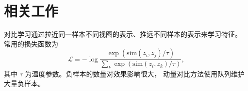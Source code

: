 \chapter{相关工作}
\label{ch:background}

对比学习通过拉近同一样本不同视图的表示、推远不同样本的表示来学习特征。
常用的损失函数为
\begin{equation}
  \mathcal{L} = -\log \frac{\exp(\mathrm{sim}(z_i, z_j)/\tau)}
  {\sum_{k} \exp(\mathrm{sim}(z_i, z_k)/\tau)} ,
  \label{eq:nce}
\end{equation}
其中 $\tau$ 为温度参数。负样本的数量对效果影响很大，
动量对比方法使用队列维护大量负样本\cite{he2020moco}。
